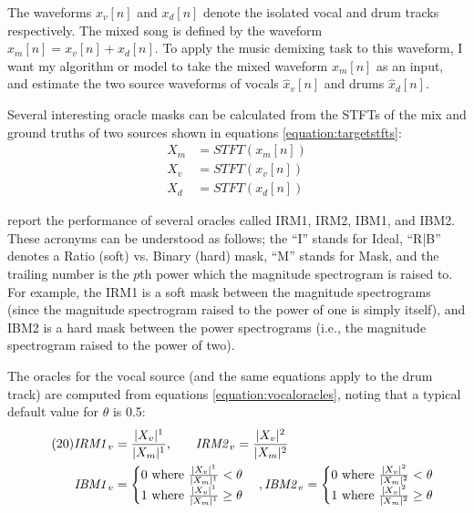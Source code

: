 \documentclass[report.tex]{subfiles}
\begin{document}
The waveforms $x_{v}[n]$ and $x_{d}[n]$ denote the isolated vocal and drum tracks respectively. The mixed song is defined by the waveform $x_{m}[n] = x_{v}[n] + x_{d}[n]$. To apply the music demixing task to this waveform, I want my algorithm or model to take the mixed waveform $x_{m}[n]$ as an input, and estimate the two source waveforms of vocals $\hat{x}_{v}[n]$ and drums $\hat{x}_{d}[n]$.

Several interesting oracle masks can be calculated from the STFTs of the mix and ground truths of two sources shown in equations \eqref{equation:targetstfts}:
\begin{align}\tag{19}\label{equation:targetstfts}
	\nonumber X_{m} &= \mathit{STFT}(x_{m}[n])\\
	\nonumber X_{v} &= \mathit{STFT}(x_{v}[n])\\
	\nonumber X_{d} &= \mathit{STFT}(x_{d}[n])
\end{align}
 
\textcite{sisec2018} report the performance of several oracles called IRM1, IRM2, IBM1, and IBM2. These acronyms can be understood as follows; the ``I'' stands for Ideal, ``R|B'' denotes a Ratio (soft) vs. Binary (hard) mask, ``M'' stands for Mask, and the trailing number is the $p$th power which the magnitude spectrogram is raised to. For example, the IRM1 is a soft mask between the magnitude spectrograms (since the magnitude spectrogram raised to the power of one is simply itself), and IBM2 is a hard mask between the power spectrograms (i.e., the magnitude spectrogram raised to the power of two).

The oracles for the vocal source (and the same equations apply to the drum track) are computed from equations \eqref{equation:vocaloracles}, noting that a typical default value for $\theta$ is 0.5:
\begin{align}\tag{20}\label{equation:vocaloracles}
	\nonumber \mathit{IRM1}_{v} &= \frac{|X_{v}|^{1}}{|X_{m}|^{1}}\text{,\qquad}
	\nonumber \mathit{IRM2}_{v} = \frac{|X_{v}|^{2}}{|X_{m}|^{2}}\\
	\nonumber \mathit{IBM1}_{v} &= \begin{cases}
		0 \text{ where } \frac{|X_{v}|^{1}}{|X_{m}|^{1}} < \theta\\
		1 \text{ where } \frac{|X_{v}|^{1}}{|X_{m}|^{1}} \ge \theta
	\end{cases},
	\nonumber \mathit{IBM2}_{v} = \begin{cases}
		0 \text{ where } \frac{|X_{v}|^{2}}{|X_{m}|^{2}} < \theta\\
		1 \text{ where } \frac{|X_{v}|^{2}}{|X_{m}|^{2}} \ge \theta
	\end{cases}
\end{align}
\end{document}
